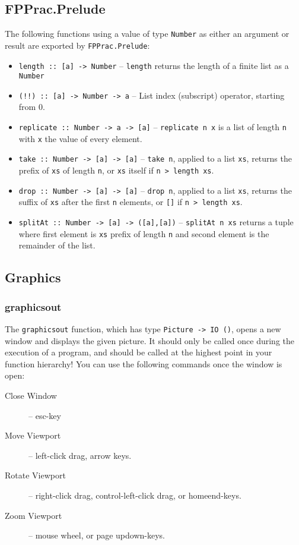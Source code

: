 \subsection{FPPrac.Prelude}
The following functions using a value of type \texttt{Number} as either an argument or result are exported by \texttt{FPPrac.Prelude}:
\begin{itemize}
  \item \verb!length :: [a] -> Number! -- \texttt{length} returns the length of a finite list as a \texttt{Number}
  \item \verb|(!!) :: [a] -> Number -> a| -- List index (subscript) operator, starting from 0.
  \item \verb!replicate :: Number -> a -> [a]! -- \texttt{replicate n x} is a list of length \texttt{n} with \texttt{x} the value of every element.
  \item \verb!take :: Number -> [a] -> [a]! -- \texttt{take n}, applied to a list \texttt{xs}, returns the prefix of \texttt{xs} of length \texttt{n}, or \texttt{xs} itself if \texttt{n > length xs}.
  \item \verb!drop :: Number -> [a] -> [a]! -- \texttt{drop n}, applied to a list \texttt{xs}, returns the suffix of \texttt{xs} after the first \texttt{n} elements, or \texttt{[]} if \texttt{n > length xs}.
  \item \verb!splitAt :: Number -> [a] -> ([a],[a])! -- \texttt{splitAt n xs} returns a tuple where first element is \texttt{xs} prefix of length \texttt{n} and second element is the remainder of the list.
\end{itemize}

\subsection{Graphics}
\subsubsection{graphicsout}
The \texttt{graphicsout} function, which has type \texttt{Picture -> IO ()}, opens a new window and displays the given picture. 
It should only be called once during the execution of a program, and should be called at the highest point in your function hierarchy!
You can use the following commands once the window is open:
\begin{description}
  \item[Close Window] -- esc-key
  \item[Move Viewport] -- left-click drag, arrow keys.
  \item[Rotate Viewport] -- right-click drag, control-left-click drag, or home\/end-keys.
  \item[Zoom Viewport] -- mouse wheel, or page up\/down-keys.
\end{description}

